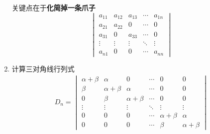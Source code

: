 \documentclass[12pt, a4paper, oneside, UTF8]{ctexbook}
\begin{document}
\begin{enumerate}[label=\arabic*.]
    \begin{tcolorbox}[title=爪型行列式]
        关键点在于\textbf{化简掉一条爪子}
        $$
        \begin{vmatrix}
            a_{11} & a_{12} & a_{13} & \cdots & a_{1n} \\
            a_{21} & a_{22} & 0      & \cdots & 0      \\
            a_{31} & 0      & a_{33} & \cdots & 0      \\
            \vdots & \vdots & \vdots & \ddots & \vdots \\
            a_{n1} & 0      & 0      & \cdots & a_{nn}
        \end{vmatrix}
        $$
    \end{tcolorbox}
    \item 计算三对角线行列式
    \begin{align*}
    D_{n}= 
    \begin{vmatrix}
    \alpha+\beta & \alpha & 0 & \cdots & 0 & 0 \\
    \beta & \alpha+\beta & \alpha & \cdots & 0 & 0 \\
    0 & \beta & \alpha+\beta & \cdots & 0 & 0 \\
    \vdots & \vdots & \vdots & \ddots & \vdots & \vdots \\
    0 & 0 & 0 & \cdots & \alpha+\beta & \alpha \\
    0 & 0 & 0 & \cdots & \beta & \alpha+\beta
    \end{vmatrix}
    \end{align*}
    

\end{enumerate}
\end{document}
